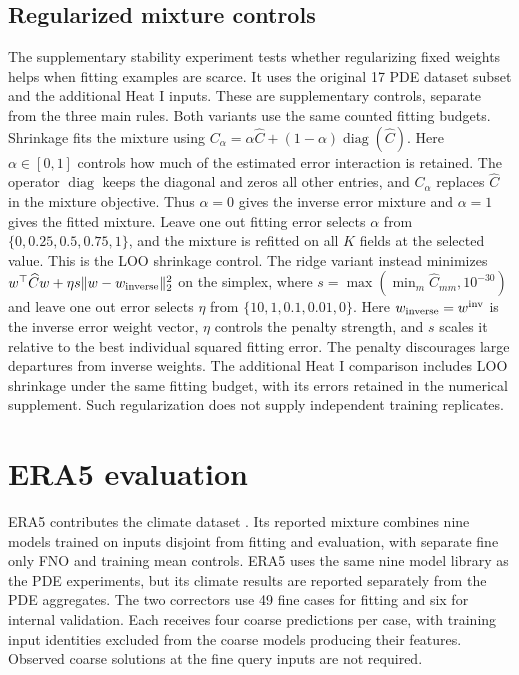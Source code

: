 \begin{table}[h!]
\centering\small
\caption{The two stages of the empirical comparison. Wins and losses require a
relative difference greater than 1\%. Ratios are geometric means. The references
called best use evaluation answers only for this retrospective analysis.}

\end{table}

\subsection{Regularized mixture controls}
The supplementary stability experiment tests whether regularizing fixed
weights helps when fitting examples are scarce. It uses the original 17 PDE
dataset subset and the additional Heat I inputs. These are supplementary
controls, separate from the three main rules. Both variants
use the same counted fitting budgets. Shrinkage fits the mixture using
$C_\alpha=\alpha\widehat C+(1-\alpha)\operatorname{diag}(\widehat C)$.
Here $\alpha\in[0,1]$ controls how much of the estimated error interaction is
retained. The operator $\operatorname{diag}$ keeps the diagonal and zeros all
other entries, and $C_\alpha$ replaces $\widehat C$ in the mixture objective.
Thus $\alpha=0$ gives the inverse error mixture and $\alpha=1$ gives the
fitted mixture. Leave one out fitting error selects $\alpha$ from
$\{0,0.25,0.5,0.75,1\}$, and the mixture is refitted on all $K$ fields at the selected value.
This is the LOO shrinkage control. The ridge variant instead minimizes
$w^\top\widehat Cw+\eta s\lVert w-w_{\rm inverse}\rVert_2^2$ on the simplex,
where $s=\max(\min_m\widehat C_{mm},10^{-30})$ and leave one out error selects
$\eta$ from $\{10,1,0.1,0.01,0\}$.
Here $w_{\rm inverse}=w^{\rm inv}$ is the inverse error weight vector, $\eta$ controls the
penalty strength, and $s$ scales it relative to the best individual squared
fitting error. The penalty discourages large departures from inverse weights.
The additional Heat I comparison includes LOO shrinkage under the same fitting
budget, with its errors retained in the numerical supplement.
Such regularization does not supply independent training replicates.





\section{ERA5 evaluation}
\label{app:climateprotocol}
ERA5 contributes the climate dataset \citep{hersbach2020,niu2024}.
Its reported mixture combines nine models trained on inputs disjoint from
fitting and evaluation, with separate fine only FNO and training mean
controls.
ERA5 uses the same nine model library as the PDE experiments, but its climate
results are reported separately from the PDE aggregates. The two correctors
use 49 fine cases for fitting and six for internal validation. Each receives
four coarse predictions per case, with training input identities excluded from
the coarse models producing their features. Observed coarse solutions at the
fine query inputs are not required.


